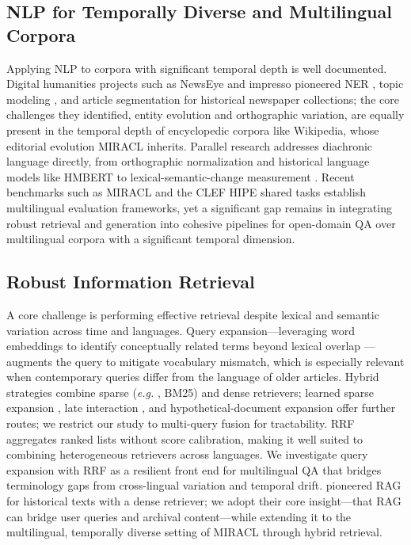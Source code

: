 \documentclass[11pt]{article}
\newcommand{\eg}{\textit{e.g. }}
\begin{document}
\subsection{NLP for Temporally Diverse and Multilingual Corpora}
Applying NLP to corpora with significant temporal depth is well documented. Digital humanities projects such as NewsEye \citep{doucet2020newseye} and impresso \citep{ehrmann2020language} pioneered NER \citep{10.1007/978-3-030-58219-7_21}, topic modeling \citep{hengchen2021challengescomputationallexicalsemantic,Blevins2015JaneJ}, and article segmentation \citep{10.1145/3340531.3412767} for historical newspaper collections; the core challenges they identified, entity evolution and orthographic variation, are equally present in the temporal depth of encyclopedic corpora like Wikipedia, whose editorial evolution MIRACL inherits. Parallel research addresses diachronic language directly, from orthographic normalization \citep{dong2018multi} and historical language models like HMBERT \citep{schweter2022hmbert} to lexical-semantic-change measurement \citep{schlechtweg2020semeval,tahmasebi2018survey}. Recent benchmarks such as MIRACL \citep{zhang2023miracl} and the CLEF HIPE shared tasks \citep{10.1007/978-3-030-58219-7_21,ehrmann2022overview} establish multilingual evaluation frameworks, yet a significant gap remains in integrating robust retrieval and generation into cohesive pipelines for open-domain QA over multilingual corpora with a significant temporal dimension.

\subsection{Robust Information Retrieval}
A core challenge is performing effective retrieval despite lexical and semantic variation across time and languages. Query expansion---leveraging word embeddings to identify conceptually related terms beyond lexical overlap \citep{roy2016usingwordembeddingsautomatic,Carpineto2012ASO}---augments the query to mitigate vocabulary mismatch, which is especially relevant when contemporary queries differ from the language of older articles. Hybrid strategies \citep{thakur2021beirheterogenousbenchmarkzeroshot} combine sparse (\eg, BM25) and dense retrievers; learned sparse expansion \citep{formal2021splade}, late interaction \citep{khattab2020colbert}, and hypothetical-document expansion \citep{gao2023hyde} offer further routes; we restrict our study to multi-query fusion for tractability. RRF \citep{10.1145/1571941.1572114} aggregates ranked lists without score calibration, making it well suited to combining heterogeneous retrievers across languages. We investigate query expansion with RRF as a resilient front end for multilingual QA that bridges terminology gaps from cross-lingual variation and temporal drift. \citet{gonzalez2024retrieval} pioneered RAG for historical texts with a dense retriever; we adopt their core insight---that RAG can bridge user queries and archival content---while extending it to the multilingual, temporally diverse setting of MIRACL through hybrid retrieval.
\end{document}
